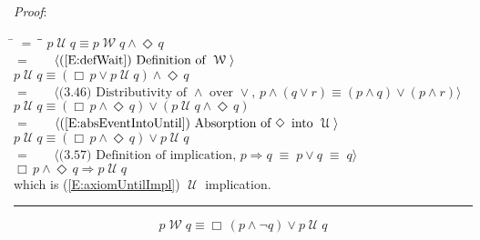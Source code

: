 \documentclass[12pt, fleqn, leqno]{article}
\newcommand{\lgap}{2pt}                             %
\newcommand{\mymathindent}{24pt}                    %
\newcommand{\equivs}{\ensuremath{\;\equiv\;}}       %
\newcommand{\impl}{\ensuremath{\Rightarrow}}        %
\newcommand{\Until}{\;\mathcal{U}\;}
\newcommand{\Wait}{\;\mathcal{W}\;}
\newcommand{\Event}{\Diamond\,}
\newcommand{\Always}{\Box\,}
\newcommand{\myqed}{\rule[-.23ex]{1.2ex}{2.0ex}}
\newcommand{\myqedtab}{\hspace{384pt}}              %
\newcommand{\Gll} {\langle}                         %
\newcommand{\Ggg} {\rangle}                         %
\newcommand{\Hint}[1]     {\ \ \ $\Gll              \mbox{#1} \Ggg$ }   %
\begin{document}
\emph{Proof}:
\begin{tabbing}
\hspace{\mymathindent} \= $= \;$ \= \myqedtab \= \kill
\> \> $p \Until q \equiv p \Wait q\land \Event q$\\[\lgap]
\> $=$ \> \Hint{(\ref{E:defWait}) Definition of $\Wait$} \\[\lgap]
\> \> $p \Until q \equiv (\Always p\lor p \Until q)\land \Event q$\\[\lgap]
\> $=$ \> \Hint{(3.46) Distributivity of $\land$ over $\lor$, $p\land (q\lor r)\equiv (p\land q)\lor (p\land r)$} \\[\lgap]
\> \> $p \Until q \equiv (\Always p\land \Event q)\lor (p \Until q\land \Event q)$\\[\lgap]
\> $=$ \> \Hint{(\ref{E:absEventIntoUntil}) Absorption of $\Event$ into $\Until$} \\[\lgap]
\> \> $p \Until q \equiv (\Always p\land \Event q)\lor p \Until q$\\[\lgap]
\> $=$ \> \Hint{(3.57) Definition of implication, $p\impl q\equivs p\lor q \equivs q$} \\[\lgap]
\> \> $\Always p\land \Event q\impl p\Until q$\\[\lgap]
\> which is (\ref{E:axiomUntilImpl}) $\Until$ implication. \quad \myqed
\end{tabbing}
\begin{equation}\label{E:EmersonEquiv}
p \Wait q  \equiv \Always (p \land \neg q) \lor p \Until q
\end{equation}
\end{document}
